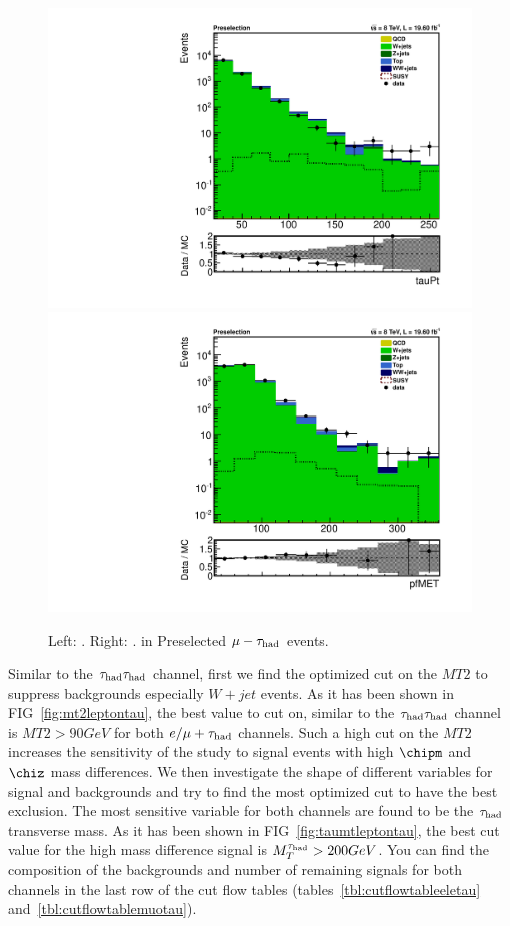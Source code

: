 \begin{figure}[htbp]
\centering
\includegraphics[angle=0,scale=0.35]{SelectionMuTau/tauPt_muTau.pdf}
\includegraphics[angle=0,scale=0.35]{SelectionMuTau/pfMET_muTau.pdf}
\caption{Left: \Tau\PT. Right: \MET. in Preselected $\mu-\tau_{\rm had}$ events.}
\label{fig:datamcmuotau}
\end{figure}

Similar to the $\tau_{\rm had}\tau_{\rm had}$ channel, first we find the optimized cut on the $MT2$ to suppress backgrounds especially $W+jet$ events. As it has been shown in FIG~\ref{fig:mt2leptontau}, the best value to cut on, similar to the $\tau_{\rm had}\tau_{\rm had}$ channel is $MT2 > 90 GeV$ for both $e/\mu+\tau_{\rm had}$ channels. Such a high cut on the $MT2$ increases the sensitivity of the study to signal events with high $\chipm$ and $\chiz$ mass differences. We then investigate the shape of different variables for signal and backgrounds and try to find the most optimized cut to have the best exclusion. The most sensitive variable for both channels are found to be the $\tau_{\rm had}$ transverse mass. As it has been shown in FIG~\ref{fig:taumtleptontau}, the best cut value for the high mass difference signal is $M_{T}^{\tau_{\rm had}} > 200 GeV$. You can find the composition of the backgrounds and number of remaining signals for both channels in the last row of the cut flow tables (tables~\ref{tbl:cutflowtableeletau} and~\ref{tbl:cutflowtablemuotau}).

